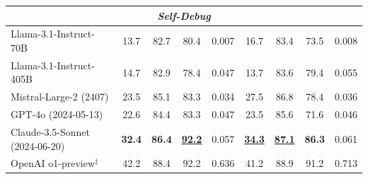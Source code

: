 \begin{table}[t]
\begin{tabular}{lcccccccc}
\midrule
\multicolumn{9}{c}{\textit{Self-Debug}} \\
\midrule
Llama-3.1-Instruct-70B & 13.7 & 82.7 & 80.4 & 0.007 & 16.7 & 83.4 & 73.5 & 0.008 \\
Llama-3.1-Instruct-405B & 14.7 & 82.9 & 78.4 & 0.047 & 13.7 & 83.6 & 79.4 & 0.055 \\
Mistral-Large-2 (2407) & 23.5 & 85.1 & 83.3 & 0.034 & 27.5 & 86.8 & 78.4 & 0.036 \\
\midrule
GPT-4o (2024-05-13) & 22.6 & 84.4 & 83.3 & 0.047 & 23.5 & 85.6 & 71.6 & 0.046 \\
Claude-3.5-Sonnet (2024-06-20) & \textbf{32.4} & \textbf{86.4} & \underline{\textbf{92.2}} & 0.057 & \underline{\textbf{34.3}} & \underline{\textbf{87.1}} & \textbf{86.3} & 0.061 \\
\rowcolor{mygray}
OpenAI o1-preview$^\ddag$ & 42.2 & 88.4 & 92.2 & 0.636 & 41.2 & 88.9 & 91.2 & 0.713 \\
\bottomrule
\end{tabular}
\label{tab:main_results}
\vspace{-11pt}
\end{table}     
